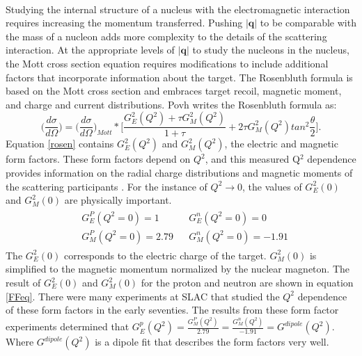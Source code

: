 \paragraph{} Studying the internal structure of a nucleus with the electromagnetic interaction requires increasing the momentum transferred. Pushing $|\boldsymbol{q}|$ to be comparable with the mass of a nucleon adds more complexity to the details of the scattering interaction. At the appropriate levels of $|\boldsymbol{q}|$ to study the nucleons in the nucleus, the Mott cross section equation requires modifications to include additional factors that incorporate information about the target. The Rosenbluth formula is based on the Mott cross section and embraces target recoil, magnetic moment, and charge and current distributions. Povh \cite{PnN} writes the Rosenbluth formula as:
\begin{equation}
\label{rosen}
\bigg(\frac{d\sigma}{d\Omega}\bigg)=\bigg(\frac{d\sigma}{d\Omega}\bigg)_{Mott} *\bigg\lbrack \frac{G^2_E(Q^2) +\tau G^2_M(Q^2)}{1+\tau} + 2\tau G^2_M(Q^2)tan^2\frac{\theta}{2} \bigg\rbrack.
\end{equation}
Equation \ref{rosen} contains $G^2_E(Q^2)$ and $G^2_M(Q^2)$, the electric and magnetic form factors. These form factors depend on $Q^2$, and this measured Q$^2$ dependence provides information on the radial charge distributions and magnetic moments of the scattering participants \cite{PnN}. For the instance of $Q^2 \rightarrow 0$, the values of  $G^2_E(0)$ and $G^2_M(0)$ are physically important.
\begin{align}
	\begin{split}
		&G^P_E(Q^2=0) = 1 \\
		&G^P_M(Q^2=0) = 2.79
	\end{split}
	\begin{split}
	    &G^n_E(Q^2=0) = 0 \\
	    &G^n_M(Q^2=0) = -1.91 \label{FFeq}
	\end{split}
\end{align}
The $G^2_E(0)$ corresponds to the electric charge of the target. $G^2_M(0)$ is simplified to the magnetic momentum normalized by the nuclear magneton. The result of $G^2_E(0)$ and $G^2_M(0)$ for the proton and neutron are shown in equation \ref{FFeq}\cite{PnN}. There were many experiments at SLAC that studied the $Q^2$ dependence of these form factors in the early seventies. The results from these form factor experiments determined that $G^p_E(Q^2) = \frac{G^P_M(Q^2)}{2.79} = \frac{G^n_M(Q^2)}{-1.91} = G^{dipole}(Q^2)$. Where $G^{dipole}(Q^2)$ is a dipole fit that describes the form factors very well\cite{PnN}.

